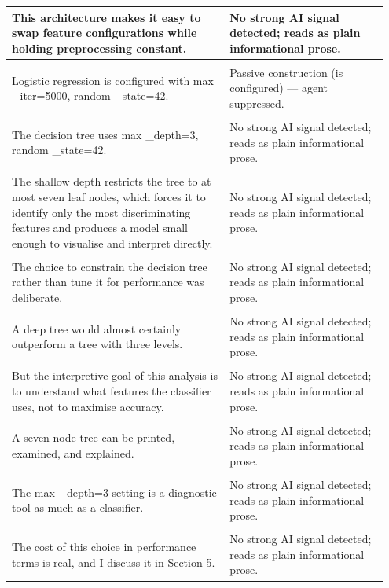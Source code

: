 \documentclass[11pt]{article}
\begin{document}
\begin{longtable}{|p{0.55\linewidth}|p{0.40\linewidth}|}
\hline
This architecture makes it easy to swap feature configurations while holding preprocessing constant. & No strong AI signal detected; reads as plain informational prose. \\[2pt]
\hline
\rule{0pt}{3.5cm} & \\
\hline
Logistic regression is configured with max \_iter=5000, random \_state=42. & Passive construction (is configured) --- agent suppressed. \\[2pt]
\hline
\rule{0pt}{3.5cm} & \\
\hline
The decision tree uses max \_depth=3, random \_state=42. & No strong AI signal detected; reads as plain informational prose. \\[2pt]
\hline
\rule{0pt}{3.5cm} & \\
\hline
The shallow depth restricts the tree to at most seven leaf nodes, which forces it to identify only the most discriminating features and produces a model small enough to visualise and interpret directly. & No strong AI signal detected; reads as plain informational prose. \\[2pt]
\hline
\rule{0pt}{3.5cm} & \\
\hline
The choice to constrain the decision tree rather than tune it for performance was deliberate. & No strong AI signal detected; reads as plain informational prose. \\[2pt]
\hline
\rule{0pt}{3.5cm} & \\
\hline
A deep tree would almost certainly outperform a tree with three levels. & No strong AI signal detected; reads as plain informational prose. \\[2pt]
\hline
\rule{0pt}{3.5cm} & \\
\hline
But the interpretive goal of this analysis is to understand what features the classifier uses, not to maximise accuracy. & No strong AI signal detected; reads as plain informational prose. \\[2pt]
\hline
\rule{0pt}{3.5cm} & \\
\hline
A seven-node tree can be printed, examined, and explained. & No strong AI signal detected; reads as plain informational prose. \\[2pt]
\hline
\rule{0pt}{3.5cm} & \\
\hline
The max \_depth=3 setting is a diagnostic tool as much as a classifier. & No strong AI signal detected; reads as plain informational prose. \\[2pt]
\hline
\rule{0pt}{3.5cm} & \\
\hline
The cost of this choice in performance terms is real, and I discuss it in Section 5. & No strong AI signal detected; reads as plain informational prose. \\[2pt]

\end{longtable}
\end{document}
